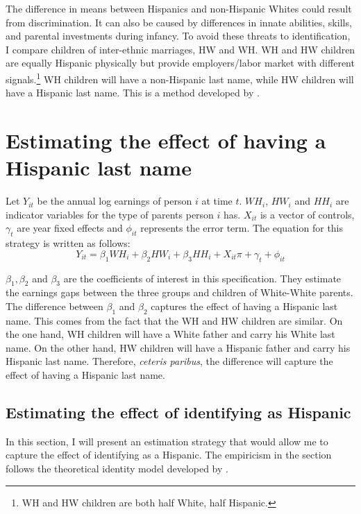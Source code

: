 \documentclass{wptemp}
\begin{document}
The difference in means between Hispanics and non-Hispanic Whites could result from discrimination. It can also be caused by differences in innate abilities, skills, and parental investments during infancy. To avoid these threats to identification, I compare children of inter-ethnic marriages, HW and WH. WH and HW children are equally Hispanic physically but provide employers/labor market with different signals.\footnote{WH and HW children are both half White, half Hispanic.} WH children will have a non-Hispanic last name, while HW children will have a Hispanic last name. This is a method developed by \citet{rubinstein2014pride}.

\section{Estimating the effect of having a Hispanic last name}

Let $Y_{it}$ be the annual log earnings of person $i$ at time $t$. $WH_{i}$, $HW_{i}$ and $HH_{i}$ are indicator variables for the type of parents person $i$ has. $X_{it}$ is a vector of controls, $\gamma_{t}$ are year fixed effects and $\phi_{it}$ represents the error term. The equation for this strategy is written as follows:
\begin{equation} \label{eq:1a}
Y_{it} = \beta_{1} WH_{i} +\beta_{2} HW_{i} + \beta_{3} HH_{i} + X_{it} \pi + \gamma_{t}+\phi_{it}
\end{equation}

$\beta_{1}, \beta_{2}$ and $\beta_{3}$ are the coefficients of interest in this specification. They estimate the earnings gaps between the three groups and children of White-White parents. The difference between $\beta_{1}$ and $\beta_{2}$ captures the effect of having a Hispanic last name. This comes from the fact that the WH and HW children are similar. On the one hand, WH children will have a White father and carry his White last name. On the other hand, HW children will have a Hispanic father and carry his Hispanic last name. Therefore, \textit{ceteris paribus}, the difference will capture the effect of having a Hispanic last name.

\subsection{Estimating the effect of identifying as Hispanic}

In this section, I will present an estimation strategy that would allow me to capture the effect of identifying as a Hispanic. The empiricism in the section follows the theoretical identity model developed by \citet{akerlof2000economics}. 
\end{document}
